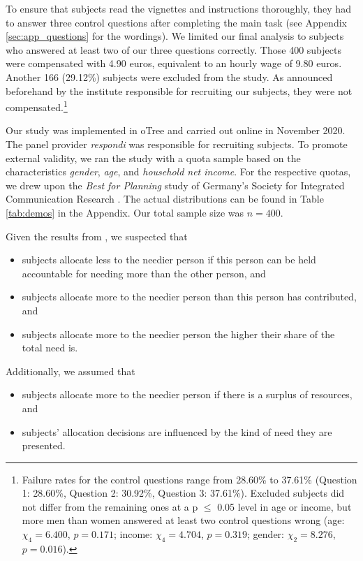 \documentclass[egregdoesnotlikesansseriftitles]{scrartcl}
\begin{document}
To ensure that subjects read the vignettes and instructions thoroughly, they had to answer three control questions after completing the main task (see Appendix \ref{sec:app_questions} for the wordings).
We limited our final analysis to subjects who answered at least two of our three questions correctly.
Those 400 subjects were compensated with 4.90 euros, equivalent to an hourly wage of 9.80 euros.
Another 166 (29.12\%) subjects were excluded from the study.
As announced beforehand by the institute responsible for recruiting our subjects, they were not compensated.\footnote{Failure rates for the control questions range from 28.60\% to 37.61\% (Question 1: 28.60\%, Question 2: 30.92\%, Question 3: 37.61\%). Excluded subjects did not differ from the remaining ones at a p $\le$ 0.05 level in age or income, but more men than women answered at least two control questions wrong (age: $\chi_4=6.400$, $p=0.171$; income: $\chi_4=4.704$, $p=0.319$; gender: $\chi_2=8.276$, $p=0.016$).}

Our study was implemented in oTree \citep{chen_otree_2016} and carried out online in November 2020.
The panel provider \textit{respondi} was responsible for recruiting subjects.
To promote external validity, we ran the study with a quota sample based on the characteristics \textit{gender}, \textit{age}, and \textit{household net income}.
For the respective quotas, we drew upon the \textit{Best for Planning} study of Germany's Society for Integrated Communication Research \citep[p. 284, 291]{gesellschaft_fur_integrierte_kommunikationsforschung_best_2019}.
The actual distributions can be found in Table \ref{tab:demos} in the Appendix.
Our total sample size was $n=400$.

Given the results from \cite{bauer_need_2020}, we suspected that
\begin{itemize}
	\item[(1)] subjects allocate less to the needier person if this person can be held accountable for needing more than the other person, and
	\item[(2)] subjects allocate more to the needier person than this person has contributed, and
	\item[(3)] subjects allocate more to the needier person the higher their share of the total need is.
\end{itemize}

\noindent Additionally, we assumed that
\begin{itemize}
	\item[(4)] subjects allocate more to the needier person if there is a surplus of resources, and
	\item[(5)] subjects' allocation decisions are influenced by the kind of need they are presented.
\end{itemize}
\end{document}
